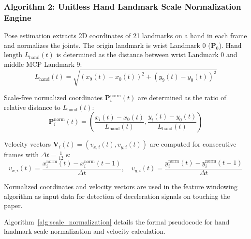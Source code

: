 \subsubsection{Algorithm 2: Unitless Hand Landmark Scale Normalization Engine}
Pose estimation extracts 2D coordinates of 21 landmarks on a hand in each frame and normalizes the joints. The origin landmark is wrist Landmark 0 ($\mathbf{P}_0$). Hand length $L_{\text{hand}}(t)$ is determined as the distance between wrist Landmark 0 and middle MCP Landmark 9:
\begin{equation}
L_{\text{hand}}(t) = \sqrt{(x_9(t) - x_0(t))^2 + (y_9(t) - y_0(t))^2}
\label{eq:hand_length_app}
\end{equation}

Scale-free normalized coordinates $\mathbf{P}_i^{\text{norm}}(t)$ are determined as the ratio of relative distance to $L_{\text{hand}}(t)$:
\begin{equation}
\mathbf{P}_i^{\text{norm}}(t) = \left( \frac{x_i(t) - x_0(t)}{L_{\text{hand}}(t)}, \frac{y_i(t) - y_0(t)}{L_{\text{hand}}(t)} \right)
\label{eq:norm_coords_app}
\end{equation}

Velocity vectors $\mathbf{V}_i(t) = (v_{x,i}(t), v_{y,i}(t))$ are computed for consecutive frames with $\Delta t = \frac{1}{12}\text{ s}$:
\begin{equation}
v_{x,i}(t) = \frac{x_i^{\text{norm}}(t) - x_i^{\text{norm}}(t-1)}{\Delta t}, \quad
v_{y,i}(t) = \frac{y_i^{\text{norm}}(t) - y_i^{\text{norm}}(t-1)}{\Delta t}
\label{eq:velocity_app}
\end{equation}

Normalized coordinates and velocity vectors are used in the feature windowing algorithm as input data for detection of deceleration signals on touching the paper.

Algorithm~\ref{alg:scale_normalization} details the formal pseudocode for hand landmark scale normalization and velocity calculation.

